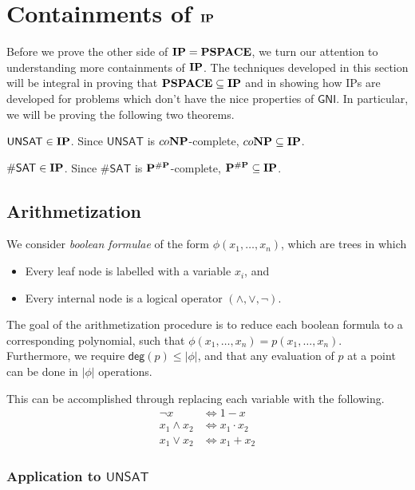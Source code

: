 \section{Containments of $\mathbf{IP}$}
Before we prove the other side of $\mathbf{IP}=\mathbf{PSPACE}$, we turn our attention to understanding more containments of $\mathbf{IP}$. The techniques developed in this section will be integral in proving that $\mathbf{PSPACE}\subseteq\mathbf{IP}$ and in showing how IPs are developed for problems which don't have the nice properties of $\mathsf{GNI}$. In particular, we will be proving the following two theorems.

\begin{theorem}
	\label{thm:unsat}
	$\mathsf{UNSAT}\in\mathbf{IP}$. Since $\mathsf{UNSAT}$ is $co\mathbf{NP}$-complete, $co\mathbf{NP}\subseteq\mathbf{IP}$.
\end{theorem}
\begin{theorem}
	$\#\mathsf{SAT}\in\mathbf{IP}$. Since $\#\mathsf{SAT}$ is $\mathbf{P}^{\#\mathbf{P}}$-complete, $\mathbf{P}^{\#\mathbf{P}}\subseteq\mathbf{IP}$.
\end{theorem}

\subsection{Arithmetization}

We consider \textit{boolean formulae} of the form $\phi(x_1,\dots,x_n)$, which are trees in which
\begin{itemize}
	\item Every leaf node is labelled with a variable $x_i$, and
	\item Every internal node is a logical operator $(\wedge, \vee, \neg).$
\end{itemize}

The goal of the arithmetization procedure is to reduce each boolean formula to a corresponding polynomial, such that $\phi(x_1,\dots,x_n)=p(x_1,\dots,x_n)$. Furthermore, we require $\mathsf{deg}(p)\leq|\phi|$, and that any evaluation of $p$ at a point can be done in $|\phi|$ operations.

This can be accomplished through replacing each variable with the following.
\begin{align*}
	\neg x&\Leftrightarrow 1-x\\
	x_1\wedge x_2&\Leftrightarrow x_1\cdot x_2\\
	x_1\vee x_2&\Leftrightarrow x_1+x_2
\end{align*}

\subsubsection{Application to $\mathsf{UNSAT}$}

